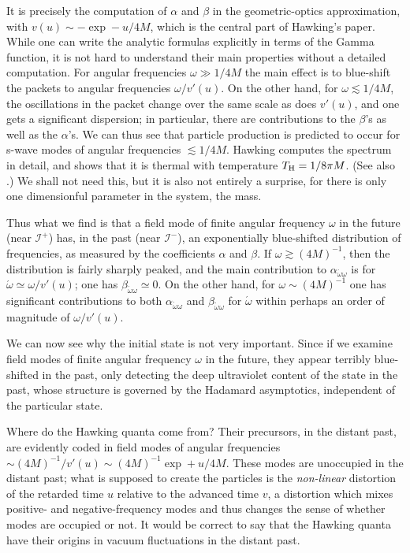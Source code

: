 \documentclass[
%
draft    %
,numberedheadings 
,bibliocites
  ]
  {aipproc}
\newcommand{\scrif}{{{\mathscr I}^{+}}}
\newcommand{\scrip}{{{\mathscr I}^{-}}}
\newcommand{\vv}{{v}}
\begin{document}
It is precisely the computation of $\alpha$ and $\beta$ in the geometric-optics approximation, with $\vv (u)\sim -\exp -u/4M$, which is the central part of Hawking's paper.  While one can write the analytic formulas explicitly in terms of the Gamma function, it is not hard to understand their main properties without a detailed computation.  For angular frequencies $\omega \gg 1/4M$ the main effect is to blue-shift the packets to angular frequencies $\omega /\vv '(u)$.  On the other hand, for $\omega \lesssim 1/4M$, the oscillations in the packet change over the same scale as does $\vv '(u)$, and one gets a significant dispersion; in particular, there are contributions to the $\beta$'s as well as the $\alpha$'s.  We can thus see that particle production is predicted to occur for s-wave modes of angular frequencies $\lesssim 1/4M$.
Hawking computes the spectrum in detail, and shows that it is thermal with temperature $T_{\rm H}=1/8\pi M$.  (See also \citet{Wald:1975kc}.)  We shall not need this, but it is also not entirely a surprise, for there is only one dimensionful parameter in the system, the mass.

Thus what we find is that a field mode of finite angular frequency $\omega$ in the future (near $\scrif$) has, in the past (near $\scrip$), an exponentially blue-shifted distribution of frequencies, as measured by the coefficients $\alpha$ and $\beta$.  If $\omega\gtrsim (4M)^{-1}$, then the distribution is fairly sharply peaked, and the main contribution to $\alpha _{\acute\omega \omega}$ is for $\acute\omega\simeq \omega /\vv '(u)$; one has $\beta _{\acute\omega \omega}\simeq 0$.  On the other hand, for $\omega\sim (4M)^{-1}$ one has significant contributions to both $\alpha _{\acute\omega \omega}$ and $\beta _{\acute\omega \omega}$ for $\acute\omega$ within perhaps an order of magnitude of $\omega /\vv '(u)$.

We can now see why the initial state is not very important.  Since if we examine field modes of finite angular frequency $\omega$ in the future, they appear terribly blue-shifted in the past, only detecting the deep ultraviolet content of the state in the past, whose structure is governed by the Hadamard asymptotics, independent of the particular state.

Where do the Hawking quanta come from?  Their precursors, in the distant past, are evidently coded in field modes of 
angular frequencies $\sim (4M)^{-1}/\vv '(u)\sim (4 M)^{-1}\exp +u/4M$.  These modes are unoccupied in the distant past; what is supposed to create the particles is the {\em non-linear} distortion of the retarded time $u$ relative to the advanced time $v$, a distortion which mixes positive- and negative-frequency modes and thus changes the sense of whether modes are occupied or not.
It would be correct to say that the Hawking quanta have their origins in vacuum fluctuations in the distant past.
\end{document}
